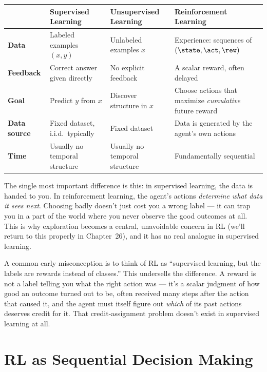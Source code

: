 \begin{center}
\begin{tabular}{@{}p{2.6cm}p{3.6cm}p{3.6cm}p{3.6cm}@{}}
\toprule
& \textbf{Supervised Learning} & \textbf{Unsupervised Learning} & \textbf{Reinforcement Learning} \\
\midrule
\textbf{Data} & Labeled examples $(x, y)$ & Unlabeled examples $x$ & Experience: sequences of $(\state, \act, \rew)$ \\
\textbf{Feedback} & Correct answer given directly & No explicit feedback & A scalar reward, often delayed \\
\textbf{Goal} & Predict $y$ from $x$ & Discover structure in $x$ & Choose actions that maximize \emph{cumulative} future reward \\
\textbf{Data source} & Fixed dataset, i.i.d.\ typically & Fixed dataset & Data is generated by the agent's own actions \\
\textbf{Time} & Usually no temporal structure & Usually no temporal structure & Fundamentally sequential \\
\bottomrule
\end{tabular}
\end{center}

\begin{keyidea}
The single most important difference is this: in supervised learning, the
data is handed to you. In reinforcement learning, the agent's actions
\emph{determine what data it sees next}. Choosing badly doesn't just cost
you a wrong label — it can trap you in a part of the world where you never
observe the good outcomes at all. This is why exploration becomes a
central, unavoidable concern in RL (we'll return to this properly in
Chapter~26), and it has no real analogue in supervised learning.
\end{keyidea}

\begin{commonmistakes}
A common early misconception is to think of RL as ``supervised learning,
but the labels are rewards instead of classes.'' This undersells the
difference. A reward is not a label telling you what the right action
was — it's a scalar judgment of how good an outcome turned out to be,
often received many steps after the action that caused it, and the agent
must itself figure out \emph{which} of its past actions deserves credit
for it. That credit-assignment problem doesn't exist in supervised
learning at all.
\end{commonmistakes}

\section{RL as Sequential Decision Making}

